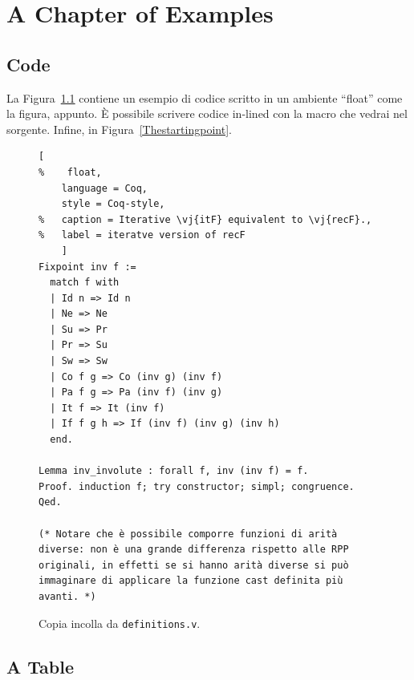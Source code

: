 \chapter{A Chapter of Examples}
\label{chapter1}

\section{Code}
La Figura~\ref{iteratve version of recF} contiene un esempio di codice scritto in un ambiente ``float'' come la figura, appunto.
È possibile scrivere codice in-lined  con la macro che vedrai nel sorgente.
Infine, in Figura~\ref{Thestartingpoint}.

\begin{figure}
\begin{lstlisting}[
%    float,
	language = Coq,
	style = Coq-style,
%	caption = Iterative \vj{itF} equivalent to \vj{recF}.,
%	label = iteratve version of recF
	]
Fixpoint inv f :=
  match f with
  | Id n => Id n
  | Ne => Ne
  | Su => Pr
  | Pr => Su
  | Sw => Sw
  | Co f g => Co (inv g) (inv f)
  | Pa f g => Pa (inv f) (inv g)
  | It f => It (inv f)
  | If f g h => If (inv f) (inv g) (inv h)
  end.

Lemma inv_involute : forall f, inv (inv f) = f.
Proof. induction f; try constructor; simpl; congruence. Qed.

(* Notare che è possibile comporre funzioni di arità diverse: non è una grande differenza rispetto alle RPP originali, in effetti se si hanno arità diverse si può immaginare di applicare la funzione cast definita più avanti. *)
\end{lstlisting}
\caption{Copia incolla da \texttt{definitions.v}.}
\label{iteratve version of recF}
\end{figure}







\section{A Table}

